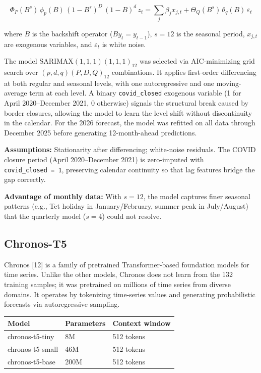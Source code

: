 \documentclass[
]{article}
\begin{document}
\[\Phi_P(B^s)\,\phi_p(B)\,(1-B^s)^D\,(1-B)^d\, z_t = \sum_{j} \beta_j x_{j,t} + \Theta_Q(B^s)\,\theta_q(B)\,\varepsilon_t\]

where \(B\) is the backshift operator (\(B y_t = y_{t-1}\)), \(s = 12\)
is the seasonal period, \(x_{j,t}\) are exogenous variables, and
\(\varepsilon_t\) is white noise.

The model SARIMAX\((1,1,1)(1,1,1)_{12}\) was selected via AIC-minimizing
grid search over \((p,d,q)(P,D,Q)_{12}\) combinations. It applies
first-order differencing at both regular and seasonal levels, with one
autoregressive and one moving-average term at each level. A binary
\texttt{covid\_closed} exogenous variable (1 for April 2020--December
2021, 0 otherwise) signals the structural break caused by border
closures, allowing the model to learn the level shift without
discontinuity in the calendar. For the 2026 forecast, the model was
refitted on all data through December 2025 before generating
12-month-ahead predictions.

\textbf{Assumptions:} Stationarity after differencing; white-noise
residuals. The COVID closure period (April 2020--December 2021) is
zero-imputed with \texttt{covid\_closed\ =\ 1}, preserving calendar
continuity so that lag features bridge the gap correctly.

\textbf{Advantage of monthly data:} With \(s = 12\), the model captures
finer seasonal patterns (e.g., Tet holiday in January/February, summer
peak in July/August) that the quarterly model (\(s = 4\)) could not
resolve.

\subsection{Chronos-T5}\label{chronos-t5}

Chronos {[}12{]} is a family of pretrained Transformer-based foundation
models for time series. Unlike the other models, Chronos does not learn
from the 132 training samples; it was pretrained on millions of time
series from diverse domains. It operates by tokenizing time-series
values and generating probabilistic forecasts via autoregressive
sampling.

\begin{longtable}[]{@{}lll@{}}
\toprule\noalign{}
Model & Parameters & Context window \\
\midrule\noalign{}
\endhead
\bottomrule\noalign{}
\endlastfoot
chronos-t5-tiny & 8M & 512 tokens \\
chronos-t5-small & 46M & 512 tokens \\
chronos-t5-base & 200M & 512 tokens \\
\end{longtable}
\end{document}
